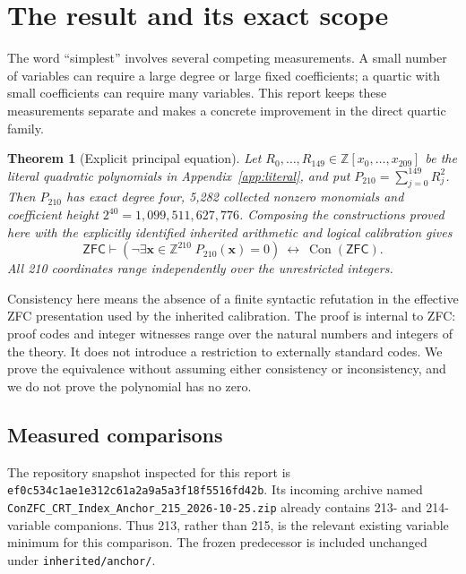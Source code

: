 \documentclass[11pt,a4paper]{article}
\newtheorem{theorem}{Theorem}[section]
\theoremstyle{remark}\newtheorem{remark}[theorem]{Remark}
\newcommand{\Z}{\mathbb Z}
\newcommand{\Con}{\operatorname{Con}}
\newcommand{\ZFC}{\mathsf{ZFC}}
\begin{document}
\section{The result and its exact scope}

The word ``simplest'' involves several competing measurements. A small number
of variables can require a large degree or large fixed coefficients; a
quartic with small coefficients can require many variables. This report
keeps these measurements separate and makes a concrete improvement in the
direct quartic family.

\begin{theorem}[Explicit principal equation]\label{thm:main}
Let $R_0,\ldots,R_{149}\in\Z[x_0,\ldots,x_{209}]$ be the literal quadratic
polynomials in Appendix~\ref{app:literal}, and put
$P_{210}=\sum_{j=0}^{149}R_j^2$. Then $P_{210}$ has exact degree four,
5,282 collected nonzero monomials and coefficient height
$2^{40}=1,099,511,627,776$. Composing the constructions proved here with the
explicitly identified inherited arithmetic and logical calibration gives
\[
\ZFC\vdash
\left(\neg\exists\boldsymbol x\in\Z^{210}\;P_{210}(\boldsymbol x)=0\right)
\ \longleftrightarrow\ \Con(\ZFC).
\]
All 210 coordinates range independently over the unrestricted integers.
\end{theorem}

Consistency here means the absence of a finite syntactic refutation in the
effective ZFC presentation used by the inherited calibration. The proof is
internal to ZFC: proof codes and integer witnesses range over the natural
numbers and integers of the theory. It does not introduce a restriction to
externally standard codes. We prove the equivalence without assuming either
consistency or inconsistency, and we do not prove the polynomial has no zero.

\subsection{Measured comparisons}

The repository snapshot inspected for this report is
\texttt{ef0c534c1ae1e312c61a2a9a5a3f18f5516fd42b}. Its incoming archive named
\texttt{ConZFC\_CRT\_Index\_Anchor\_215\_2026-10-25.zip} already contains
213- and 214-variable companions. Thus 213, rather than 215, is the relevant
existing variable minimum for this comparison. The frozen predecessor is
included unchanged under \texttt{inherited/anchor/}.
\end{document}
